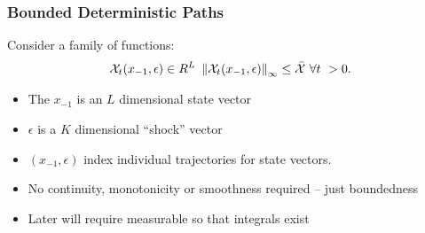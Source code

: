 \documentclass[tikz]{beamer}
\begin{document}
\begin{frame}
  \frametitle{Bounded Deterministic Paths}

Consider a family of functions:
 \begin{gather}
   \mathcal{X}_{t}(x_{-1},\epsilon) \in{R^L}\,\,\left\lVert\mathcal{X}_{t}(x_{-1},\epsilon)\right\rVert_\infty  \le \bar{\mathcal{X}}\,\,\forall t\ > 0 \label{fFamily}.
 \end{gather}
 \begin{itemize}
 \item The $x_{-1}$ is an  $L$ dimensional state vector
 \item $\epsilon$ is a $K$ dimensional ``shock'' vector
 \item  $(x_{-1},\epsilon)$ index individual trajectories for  state vectors.  
 \item No continuity, monotonicity or smoothness required  -- just boundedness
 \item Later will require measurable so that integrals exist
 \end{itemize}

\end{frame}
\end{document}
